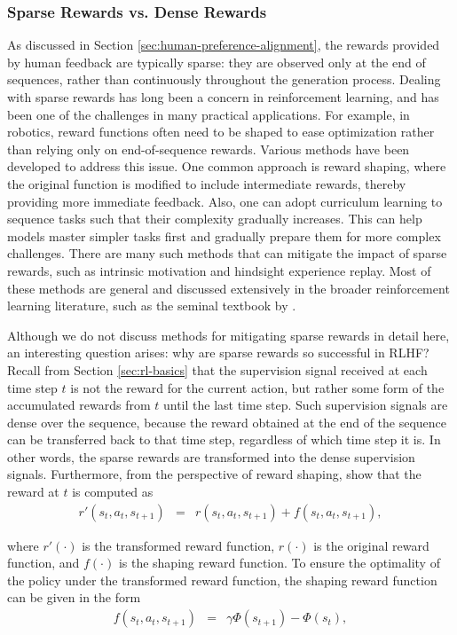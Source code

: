 \subsubsection{Sparse Rewards vs. Dense Rewards}

\noindent As discussed in Section \ref{sec:human-preference-alignment}, the rewards provided by human feedback are typically sparse: they are observed only at the end of sequences, rather than continuously throughout the generation process. Dealing with sparse rewards has long been a concern in reinforcement learning, and has been one of the challenges in many practical applications. For example, in robotics, reward functions often need to be shaped to ease optimization rather than relying only on end-of-sequence rewards. Various methods have been developed to address this issue. One common approach is reward shaping, where the original function is modified to include intermediate rewards, thereby providing more immediate feedback. Also, one can adopt curriculum learning to sequence tasks such that their complexity gradually increases. This can help models master simpler tasks first and gradually prepare them for more complex challenges. There are many such methods that can mitigate the impact of sparse rewards, such as intrinsic motivation and hindsight experience replay. Most of these methods are general and discussed extensively in the broader reinforcement learning literature, such as the seminal textbook by \citet{Sutton-and-Barto:2018RL}.

Although we do not discuss methods for mitigating sparse rewards in detail here, an interesting question arises: why are sparse rewards so successful in RLHF? Recall from Section \ref{sec:rl-basics} that the supervision signal received at each time step $t$ is not the reward for the current action, but rather some form of the accumulated rewards from $t$ until the last time step. Such supervision signals are dense over the sequence, because the reward obtained at the end of the sequence can be transferred back to that time step, regardless of which time step it is. In other words, the sparse rewards are transformed into the dense supervision signals. Furthermore, from the perspective of reward shaping, \citet{ng1999-etal:policy} show that the reward at $t$ is computed as
\begin{eqnarray}
r'(s_t,a_t,s_{t+1}) & = & r(s_t,a_t,s_{t+1}) + f(s_t,a_t,s_{t+1}), \label{eq:transformed-reward-function}
\end{eqnarray}

\noindent where $r'(\cdot)$ is the transformed reward function, $r(\cdot)$ is the original reward function, and $f(\cdot)$ is the shaping reward function. To ensure the optimality of the policy under the transformed reward function, the shaping reward function can be given in the form
\begin{eqnarray}
f(s_t,a_t,s_{t+1}) & = & \gamma \Phi(s_{t+1}) - \Phi(s_t), \label{eq:shaping-reward-function}
\end{eqnarray}

